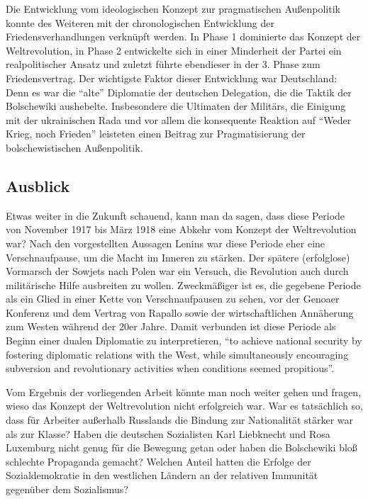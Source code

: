 \documentclass{../../sem_paper}
\begin{document}
Die Entwicklung vom ideologischen Konzept zur pragmatischen Außenpolitik konnte des Weiteren mit der chronologischen Entwicklung der Friedensverhandlungen verknüpft werden. In Phase 1 dominierte das Konzept der Weltrevolution, in Phase 2 entwickelte sich in einer Minderheit der Partei ein realpolitischer Ansatz und zuletzt führte ebendieser in der 3. Phase zum Friedensvertrag. Der wichtigste Faktor dieser Entwicklung war Deutschland: Denn es war die "`alte"' Diplomatie der deutschen Delegation, die die Taktik der Bolschewiki aushebelte. Insbesondere die Ultimaten der Militärs, die Einigung mit der ukrainischen Rada und vor allem die konsequente Reaktion auf "`Weder Krieg, noch Frieden"' leisteten einen Beitrag zur Pragmatisierung der bolschewistischen Außenpolitik.

\subsection*{Ausblick}
Etwas weiter in die Zukunft schauend, kann man da sagen, dass diese Periode von November 1917 bis März 1918 eine Abkehr vom Konzept der Weltrevolution war?
Nach den vorgestellten Aussagen Lenins war diese Periode eher eine Verschnaufpause, um die Macht im Inneren zu stärken. Der spätere (erfolglose) Vormarsch der Sowjets nach Polen war ein Versuch, die Revolution auch durch militärische  Hilfe ausbreiten zu wollen. Zweckmäßiger ist es, die gegebene Periode als ein Glied in einer Kette von Verschnaufpausen zu sehen, vor der Genoaer Konferenz und dem Vertrag von Rapallo sowie der wirtschaftlichen Annäherung zum Westen während der 20er Jahre\autocite[4]{goro1994_2}.
Damit verbunden ist diese Periode als Beginn einer dualen Diplomatie zu interpretieren, "`to achieve national security by fostering diplomatic relations with the West, while simultaneously encouraging subversion and revolutionary activities when conditions seemed propitious"'\autocite[33]{goro1994}.


Vom Ergebnis der vorliegenden Arbeit könnte man noch weiter gehen und fragen, wieso das Konzept der Weltrevolution nicht erfolgreich war. War es tatsächlich so, dass für Arbeiter außerhalb Russlands die Bindung zur Nationalität stärker war als zur Klasse? Haben die deutschen Sozialisten Karl Liebknecht und Rosa Luxemburg nicht genug für die Bewegung getan oder haben die Bolschewiki bloß schlechte Propaganda gemacht? Welchen Anteil hatten die Erfolge der Sozialdemokratie in den westlichen Ländern an der relativen Immunität gegenüber dem Sozialismus?
\end{document}
